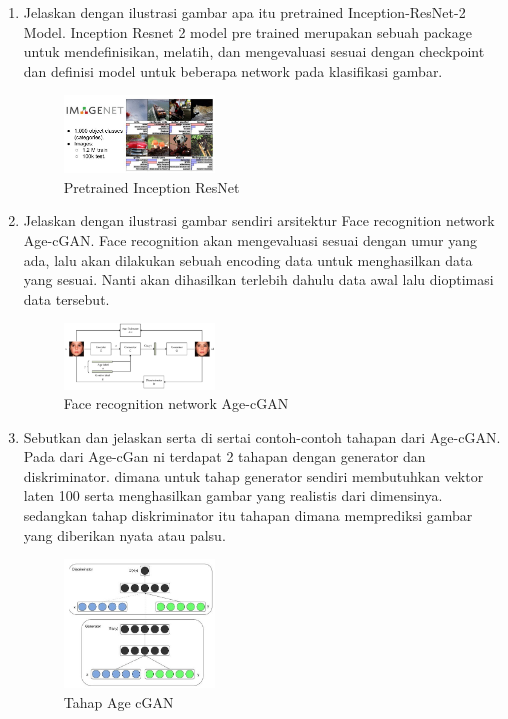 \begin{enumerate}
        \item Jelaskan dengan ilustrasi gambar apa itu pretrained Inception-ResNet-2 Model.
		Inception Resnet 2 model pre trained merupakan sebuah package untuk mendefinisikan, melatih, dan mengevaluasi sesuai dengan checkpoint dan definisi model untuk beberapa network pada klasifikasi gambar.
		\begin{figure}[H]
			\includegraphics[width=4cm]{figures/1174035/chapter9/teori6.png}
            	\centering
           	\caption{Pretrained Inception ResNet}
       	\end{figure}

        \item Jelaskan dengan ilustrasi gambar sendiri arsitektur Face recognition network Age-cGAN.
        Face recognition akan mengevaluasi sesuai dengan umur yang ada, lalu akan dilakukan sebuah encoding data untuk menghasilkan data yang sesuai. Nanti akan dihasilkan terlebih dahulu data awal lalu dioptimasi data tersebut.
		\begin{figure}[H]
			\includegraphics[width=4cm]{figures/1174035/chapter9/teori7.png}
            	\centering
           	 \caption{Face recognition network Age-cGAN}
       	 \end{figure}

        \item Sebutkan dan jelaskan serta di sertai contoh-contoh tahapan dari Age-cGAN.
		Pada dari Age-cGan ni terdapat 2 tahapan dengan generator dan diskriminator. dimana untuk tahap generator sendiri membutuhkan vektor laten 100 serta menghasilkan gambar yang realistis dari dimensinya. sedangkan tahap diskriminator itu tahapan dimana memprediksi gambar yang diberikan nyata atau palsu.
		\begin{figure}[H]
			\includegraphics[width=4cm]{figures/1174035/chapter9/teori8.png}
            	\centering
           	 \caption{Tahap Age cGAN}
       	\end{figure}


\end{enumerate}
